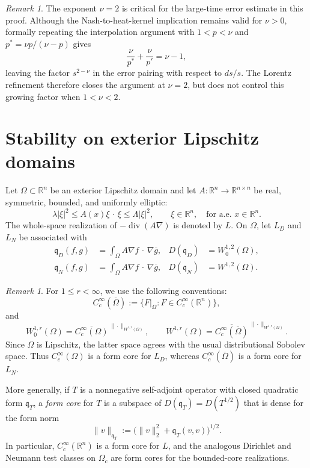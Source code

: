 \documentclass[12pt]{amsart}
\newcommand\R{\mathbb{R}}
\newcommand{\cdo}{\, \cdot \,}
\newcommand{\diver}{\operatorname{div}}
\newcommand{\abs}[1]{\left\lvert #1\right\rvert}
\theoremstyle{remark}
\newtheorem{remark}[theorem]{Remark}
\begin{document}
\begin{remark}
The exponent $\nu=2$ is critical for the large-time error estimate
in this proof. Although the Nash-to-heat-kernel implication remains
valid for $\nu>0$, formally repeating the interpolation argument with
$1<p<\nu$ and $p^*=\nu p/(\nu-p)$ gives
\[
 \frac{\nu}{p^*}+\frac{\nu}{p'}=\nu-1,
\]
leaving the factor $s^{2-\nu}$ in the error pairing with respect to
$ds/s$. The Lorentz refinement therefore closes the argument at
$\nu=2$, but does not control this growing factor when $1<\nu<2$.
\end{remark}




\section{Stability on exterior Lipschitz domains}
\label{sec:exterior-reverse}

Let $\Omega\subset\R^n$ be an exterior Lipschitz domain and let
$A\colon\R^n\to\R^{n\times n}$ be real, symmetric, bounded, and uniformly
elliptic:
\[
 \lambda\abs{\xi}^2\leq A(x)\xi\mathbin{\cdo}\xi
 \leq\Lambda\abs\xi^2,
 \qquad \xi\in\R^n,\quad\text{for a.e. }x\in\R^n.
\]
The whole-space realization of $-\diver(A\nabla)$ is denoted by $L$.
On $\Omega$, let $L_D$ and $L_N$ be associated with
\begin{align*}
	\mathfrak q_D(f,g)&=\int_\Omega A\nabla f\mathbin{\cdo}\nabla\overline g,
&D(\mathfrak q_D)&=W_0^{1,2}(\Omega),\\
 \mathfrak q_N(f,g)&=\int_\Omega A\nabla f\mathbin{\cdo}\nabla\overline g,
&D(\mathfrak q_N)&=W^{1,2}(\Omega).
\end{align*}

\begin{remark}\label{rem:Sobolev-form-core}
For $1\le r<\infty$, we use the following conventions:
\[
 C_c^\infty(\overline\Omega)
 :=\{F|_\Omega:F\in C_c^\infty(\R^n)\},
\]
and
\[
 W_0^{1,r}(\Omega)
 =\overline{C_c^\infty(\Omega)}^{\,\|\cdot\|_{W^{1,r}(\Omega)}},
 \qquad
 W^{1,r}(\Omega)
 =\overline{C_c^\infty(\overline\Omega)}
 ^{\,\|\cdot\|_{W^{1,r}(\Omega)}}.
\]
Since $\Omega$ is Lipschitz, the latter space agrees with the usual
distributional Sobolev space.  Thus $C_c^\infty(\Omega)$ is a form core
for $L_D$, whereas $C_c^\infty(\overline\Omega)$ is a form core for $L_N$.

More generally, if $T$ is a nonnegative self-adjoint operator with closed
quadratic form $\mathfrak q_T$, a \emph{form core} for $T$ is a subspace of
$D(\mathfrak q_T)=D(T^{1/2})$ that is dense for the form
norm
\[
 \|v\|_{\mathfrak q_T}
 :=\bigl(\|v\|_2^2+\mathfrak q_T(v,v)\bigr)^{1/2}.
\]
In particular, $C_c^\infty(\R^n)$ is a form core for $L$,
and the analogous Dirichlet and Neumann test classes on $\Omega_c$ are
form cores for the bounded-core realizations.
\end{remark}
\end{document}
